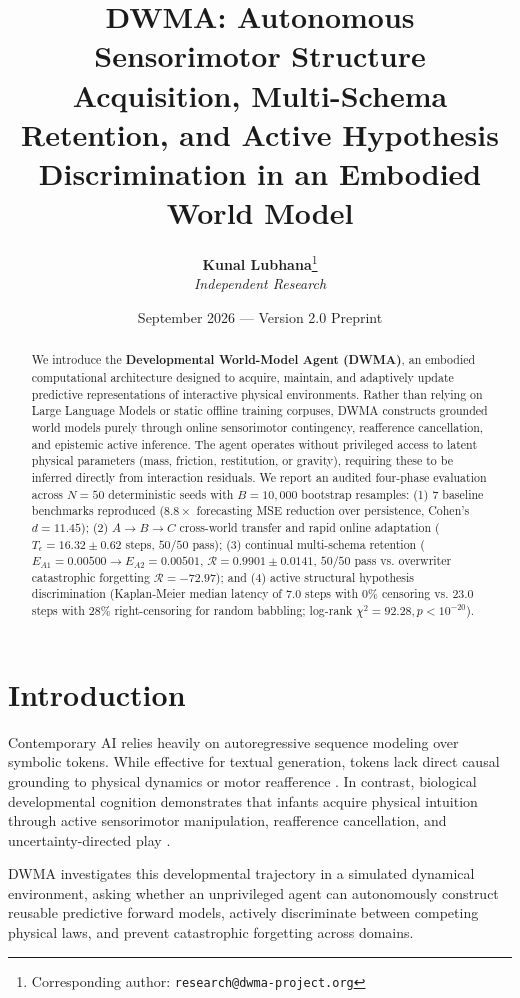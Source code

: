 \documentclass[10pt,twocolumn,a4paper]{article}
\title{\textbf{DWMA: Autonomous Sensorimotor Structure Acquisition, Multi-Schema Retention, and Active Hypothesis Discrimination in an Embodied World Model}}
\author{
  \textbf{Kunal Lubhana}\thanks{Corresponding author: \texttt{research@dwma-project.org}} \\
  \textit{Independent Research}
}
\date{September 2026 --- Version 2.0 Preprint}
\begin{document}
\maketitle

\begin{abstract}
We introduce the \textbf{Developmental World-Model Agent (DWMA)}, an embodied computational architecture designed to acquire, maintain, and adaptively update predictive representations of interactive physical environments. Rather than relying on Large Language Models or static offline training corpuses, DWMA constructs grounded world models purely through online sensorimotor contingency, reafference cancellation, and epistemic active inference. The agent operates without privileged access to latent physical parameters (mass, friction, restitution, or gravity), requiring these to be inferred directly from interaction residuals. We report an audited four-phase evaluation across $N = 50$ deterministic seeds with $B = 10,000$ bootstrap resamples: (1) 7 baseline benchmarks reproduced ($8.8\times$ forecasting MSE reduction over persistence, Cohen's $d = 11.45$); (2) $A \to B \to C$ cross-world transfer and rapid online adaptation ($T_\epsilon = 16.32 \pm 0.62$ steps, $50/50$ pass); (3) continual multi-schema retention ($E_{A1} = 0.00500 \to E_{A2} = 0.00501$, $\mathcal{R} = 0.9901 \pm 0.0141$, $50/50$ pass vs. overwriter catastrophic forgetting $\mathcal{R} = -72.97$); and (4) active structural hypothesis discrimination (Kaplan-Meier median latency of $7.0$ steps with $0\%$ censoring vs. $23.0$ steps with $28\%$ right-censoring for random babbling; log-rank $\chi^2 = 92.28, p < 10^{-20}$).
\end{abstract}

\section{Introduction}
Contemporary AI relies heavily on autoregressive sequence modeling over symbolic tokens. While effective for textual generation, tokens lack direct causal grounding to physical dynamics or motor reafference \cite{harnad1990,brooks1991,bender2020}. In contrast, biological developmental cognition demonstrates that infants acquire physical intuition through active sensorimotor manipulation, reafference cancellation, and uncertainty-directed play \cite{piaget1952,vonholst1950,friston2010,gopnik2012}. 

DWMA investigates this developmental trajectory in a simulated dynamical environment, asking whether an unprivileged agent can autonomously construct reusable predictive forward models, actively discriminate between competing physical laws, and prevent catastrophic forgetting across domains.
\end{document}
